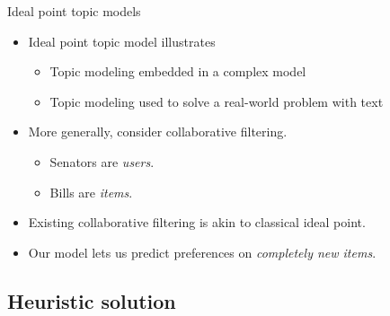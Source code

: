 \documentclass{beamer}
\begin{document}
\begin{frame}{Ideal point topic models}
  \begin{itemize}
  \item Ideal point topic model illustrates
    \begin{itemize}
    \item Topic modeling embedded in a complex model
    \item Topic modeling used to solve a real-world problem with text
    \end{itemize}
  \item More generally, consider collaborative filtering.
    \begin{itemize}
    \item Senators are \textit{users}.
    \item Bills are \textit{items}.
    \end{itemize}
  \item Existing collaborative filtering is akin to classical ideal
    point.
  \item Our model lets us predict preferences on \textit{completely new items}.
  \end{itemize}
\end{frame}



\subsection{Heuristic solution}
\end{document}
